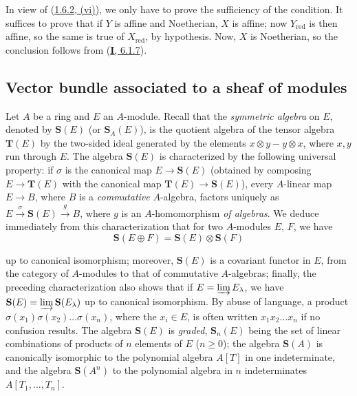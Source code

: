 In view of (\hyperref[II.1.6.2]{1.6.2, (vi)}), we only have to prove the
sufficiency of the condition. It suffices to prove that if $Y$ is affine and
Noetherian, $X$ is affine; now $Y_{\mathrm{red}}$ is then affine, so the same
is true of $X_{\mathrm{red}}$, by hypothesis. Now, $X$ is Noetherian,
so the conclusion follows from (\hyperref[I.6.1.7]{\textbf{I}, 6.1.7}).


\subsection{Vector bundle associated to a sheaf of modules}
\label{II.1.7}

\begin{env}[1.7.1]
\label{II.1.7.1}
Let $A$ be a ring and $E$ an $A$-module. Recall that the \emph{symmetric
algebra} on $E$, denoted by $\mathbf{S}(E)$ (or $\mathbf{S}_A(E)$), is
the quotient algebra of the tensor algebra $\mathbf{T}(E)$ by the two-sided
ideal generated by the elements $x\otimes y-y\otimes x$, where $x,y$
run through $E$. The algebra $\mathbf{S}(E)$ is characterized by the
following universal property: if $\sigma$ is the canonical map
$E\to\mathbf{S}(E)$ (obtained by composing $E\to\mathbf{T}(E)$ with
the canonical map $\mathbf{T}(E)\to\mathbf{S}(E)$), every
$A$-linear map $E\to B$, where $B$ is a \emph{commutative} $A$-algebra,
factors uniquely as
$E\xrightarrow{\sigma}\mathbf{S}(E)\xrightarrow{g}B$, where $g$ is an
$A$-homomorphism \emph{of algebras}. We deduce immediately from this
characterization that for two $A$-modules $E$, $F$, we have
\[
  \mathbf{S}(E\oplus F)=\mathbf{S}(E)\otimes\mathbf{S}(F)
\]

up to canonical isomorphism; moreover, $\mathbf{S}(E)$ is a covariant
functor in $E$, from the category of $A$-modules to that of commutative
$A$-algebras; finally, the preceding characterization also shows that if
$E=\varinjlim E_\lambda$, we have
$\mathbf{S}(E)=\varinjlim\mathbf{S}(E_\lambda)$ up to canonical
isomorphism. By abuse of language, a product
$\sigma(x_1)\sigma(x_2)\ldots\sigma(x_n)$, where the $x_i\in E$, is often
written $x_1x_2\ldots x_n$ if no confusion results. The algebra
$\mathbf{S}(E)$ is \emph{graded}, $\mathbf{S}_n(E)$ being the set of
linear combinations of products of $n$ elements of $E$ ($n\geq 0$);
the algebra $\mathbf{S}(A)$ is canonically isomorphic to the polynomial
algebra $A[T]$ in one indeterminate, and the algebra $\mathbf{S}(A^n)$ to
the polynomial algebra in $n$ indeterminates $A[T_1,\ldots,T_n]$.
\end{env}

